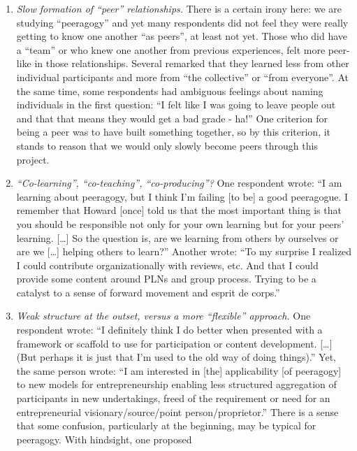 \begin{enumerate}
\def\labelenumi{\arabic{enumi}.}
\item
  \emph{Slow formation of ``peer'' relationships.} There is a certain
  irony here: we are studying ``peeragogy'' and yet many respondents did
  not feel they were really getting to know one another ``as peers'', at
  least not yet. Those who did have a ``team'' or who knew one another
  from previous experiences, felt more peer-like in those relationships.
  Several remarked that they learned less from other individual
  participants and more from ``the collective'' or ``from everyone''. At
  the same time, some respondents had ambiguous feelings about naming
  individuals in the first question: ``I felt like I was going to leave
  people out and that that means they would get a bad grade - ha!'' One
  criterion for being a peer was to have built something together, so by
  this criterion, it stands to reason that we would only slowly become
  peers through this project.
\item
  \emph{``Co-learning'', ``co-teaching'', ``co-producing''?} One
  respondent wrote: ``I am learning about peeragogy, but I think I'm
  failing {{[}to be{]}} a good peeragogue. I remember that Howard
  {{[}once{]}} told us that the most important thing is that you should
  be responsible not only for your own learning but for your peers'
  learning. {{[}\ldots{}{]}} So the question is, are we learning from
  others by ourselves or are we {{[}\ldots{}{]}} helping others to
  learn?'' Another wrote: ``To my surprise I realized I could contribute
  organizationally with reviews, etc. And that I could provide some
  content around PLNs and group process. Trying to be a catalyst to a
  sense of forward movement and esprit de corps.''
\item
  \emph{Weak structure at the outset, versus a more ``flexible''
  approach.} One respondent wrote: ``I definitely think I do better when
  presented with a framework or scaffold to use for participation or
  content development. {{[}\ldots{}{]}} (But perhaps it is just that I'm
  used to the old way of doing things).'' Yet, the same person wrote:
  ``I am interested in {{[}the{]}} applicability {{[}of peeragogy{]}} to
  new models for entrepreneurship enabling less structured aggregation
  of participants in new undertakings, freed of the requirement or need
  for an entrepreneurial visionary/source/point person/proprietor.''
  There is a sense that some confusion, particularly at the beginning,
  may be typical for peeragogy. With hindsight, one proposed

\end{enumerate}
